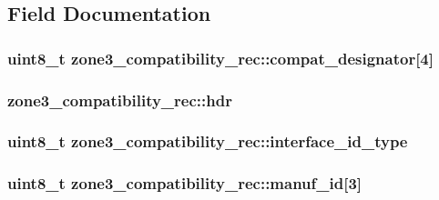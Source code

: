 \subsection{Field Documentation}
\hypertarget{structzone3__compatibility__rec_a03480dbdcacb2554fcb1ac9a50fbbf0a}{
\subsubsection[{compat\-\_\-designator}]{\setlength{\rightskip}{0pt plus 5cm}uint8\-\_\-t zone3\-\_\-compatibility\-\_\-rec\-::compat\-\_\-designator\mbox{[}4\mbox{]}}}\label{structzone3__compatibility__rec_a03480dbdcacb2554fcb1ac9a50fbbf0a}
\hypertarget{structzone3__compatibility__rec_aaeee1ffb2bf0753fd609ba04df73e5bb}{
\subsubsection[{hdr}]{ zone3\-\_\-compatibility\-\_\-rec\-::hdr}}\label{structzone3__compatibility__rec_aaeee1ffb2bf0753fd609ba04df73e5bb}
\hypertarget{structzone3__compatibility__rec_aa44f2a618536e675647b9c79efaa306f}{
\subsubsection[{interface\-\_\-id\-\_\-type}]{\setlength{\rightskip}{0pt plus 5cm}uint8\-\_\-t zone3\-\_\-compatibility\-\_\-rec\-::interface\-\_\-id\-\_\-type}}\label{structzone3__compatibility__rec_aa44f2a618536e675647b9c79efaa306f}
\hypertarget{structzone3__compatibility__rec_a640daa7dbb7c07b257fd79dec05691a8}{
\subsubsection[{manuf\-\_\-id}]{\setlength{\rightskip}{0pt plus 5cm}uint8\-\_\-t zone3\-\_\-compatibility\-\_\-rec\-::manuf\-\_\-id\mbox{[}3\mbox{]}}}\label{structzone3__compatibility__rec_a640daa7dbb7c07b257fd79dec05691a8}
